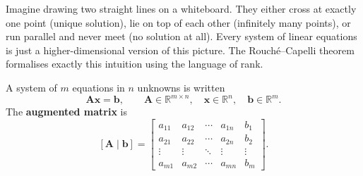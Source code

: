 \documentclass[12pt,a4paper]{article}
\begin{document}
Imagine drawing two straight lines on a whiteboard.
They either cross at exactly one point (unique solution), lie on top of each other (infinitely many points),
or run parallel and never meet (no solution at all).
Every system of linear equations is just a higher-dimensional version of this picture.
The Rouch\'{e}--Capelli theorem formalises exactly this intuition using the language of rank.

\begin{infobox}
A system of $m$ equations in $n$ unknowns is written
\[
\mathbf{A}\mathbf{x} = \mathbf{b}, \qquad
\mathbf{A} \in \mathbb{R}^{m \times n},\quad
\mathbf{x} \in \mathbb{R}^{n},\quad
\mathbf{b} \in \mathbb{R}^{m}.
\]
The \textbf{augmented matrix} is
\[
[\mathbf{A} \mid \mathbf{b}] =
\left[\begin{array}{cccc|c}
a_{11} & a_{12} & \cdots & a_{1n} & b_1 \\
a_{21} & a_{22} & \cdots & a_{2n} & b_2 \\
\vdots & \vdots & \ddots & \vdots & \vdots \\
a_{m1} & a_{m2} & \cdots & a_{mn} & b_m
\end{array}\right].
\]
\end{infobox}
\end{document}
